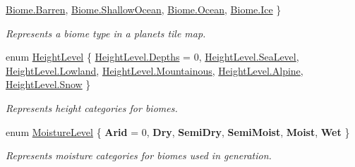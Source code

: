 \begin{DoxyCompactItemize}
\newline
\hyperlink{namespace_midnight_blue_a8a6ba5637b64c3eb991f00d48decf381a492e9acd19159730032da8322ed0666f}{Biome.\+Barren}, 
\hyperlink{namespace_midnight_blue_a8a6ba5637b64c3eb991f00d48decf381a10173502a5321287f9718e67e4516ab5}{Biome.\+Shallow\+Ocean}, 
\hyperlink{namespace_midnight_blue_a8a6ba5637b64c3eb991f00d48decf381af41054884f4a8c8cb596222e2a31f098}{Biome.\+Ocean}, 
\hyperlink{namespace_midnight_blue_a8a6ba5637b64c3eb991f00d48decf381a583d6a9fe10d672474e2cdca476113b7}{Biome.\+Ice}
 \}\begin{DoxyCompactList}\small\item\em Represents a biome type in a planets tile map. \end{DoxyCompactList}
\item 
enum \hyperlink{namespace_midnight_blue_a86f8aaa0bbb651a6a094d3eb95f799e0}{Height\+Level} \{ \newline
\hyperlink{namespace_midnight_blue_a86f8aaa0bbb651a6a094d3eb95f799e0ae4ac851fb5b81b710b30f334b99a270b}{Height\+Level.\+Depths} = 0, 
\hyperlink{namespace_midnight_blue_a86f8aaa0bbb651a6a094d3eb95f799e0ac35b4501155445656ec3b4ae8439f574}{Height\+Level.\+Sea\+Level}, 
\hyperlink{namespace_midnight_blue_a86f8aaa0bbb651a6a094d3eb95f799e0a02913046ffdc08aae59ca13b41b9aaf7}{Height\+Level.\+Lowland}, 
\hyperlink{namespace_midnight_blue_a86f8aaa0bbb651a6a094d3eb95f799e0a209a5e7243307f716da106322d7b5a06}{Height\+Level.\+Mountainous}, 
\newline
\hyperlink{namespace_midnight_blue_a86f8aaa0bbb651a6a094d3eb95f799e0a45a94c5ae2df00c49cca09d7d26c06ec}{Height\+Level.\+Alpine}, 
\hyperlink{namespace_midnight_blue_a86f8aaa0bbb651a6a094d3eb95f799e0ab46d3c8ee8032551c011745d587705cc}{Height\+Level.\+Snow}
 \}\begin{DoxyCompactList}\small\item\em Represents height categories for biomes. \end{DoxyCompactList}
\item 
enum \hyperlink{namespace_midnight_blue_a7428767e7fc0b52bab6cb270f8354e1d}{Moisture\+Level} \{ \newline
{\bfseries Arid} = 0, 
{\bfseries Dry}, 
{\bfseries Semi\+Dry}, 
{\bfseries Semi\+Moist}, 
\newline
{\bfseries Moist}, 
{\bfseries Wet}
 \}\begin{DoxyCompactList}\small\item\em Represents moisture categories for biomes used in generation. \end{DoxyCompactList}

\end{DoxyCompactItemize}
